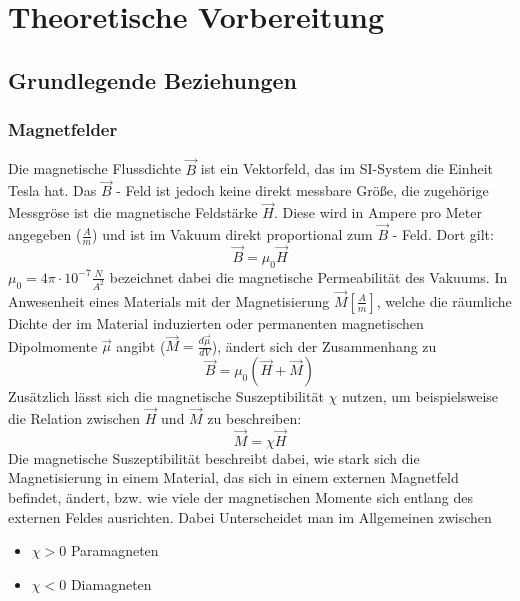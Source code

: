 \section{Theoretische Vorbereitung}
    \subsection{Grundlegende Beziehungen}
        \subsubsection{Magnetfelder}
            Die magnetische Flussdichte $\vec{B}$ ist ein Vektorfeld, das im SI-System die Einheit Tesla hat.
            Das $\vec{B}$ - Feld ist jedoch keine direkt messbare Größe, die zugehörige Messgröse ist die magnetische Feldstärke $\vec{H}$.
            Diese wird in Ampere pro Meter angegeben ($\frac{A}{m}$) und ist im Vakuum direkt proportional
            zum $\vec{B}$ - Feld. Dort gilt:
            \begin{equation}
                \vec{B} = \mu_0 \vec{H}
            \end{equation}
            $\mu_0 = 4\pi \cdot 10^{-7}\frac{N}{A^2}$ bezeichnet dabei die magnetische Permeabilität des Vakuums.
            In Anwesenheit eines Materials mit der Magnetisierung $\vec{M} [\frac{A}{m}]$, welche die räumliche Dichte der im Material induzierten oder permanenten magnetischen Dipolmomente $\vec{\mu}$ angibt ($\vec{M} = \frac{d\vec{\mu}}{dV}$), ändert sich der Zusammenhang zu
            \begin{equation}
                \vec{B} = \mu_0 (\vec{H} + \vec{M})
            \end{equation}
            Zusätzlich lässt sich die magnetische Suszeptibilität $\chi$ nutzen, um beispielsweise die Relation zwischen $\vec{H}$ und $\vec{M}$ zu beschreiben:
            \begin{equation}
                \vec{M} = \chi \vec{H}
            \end{equation}
            Die magnetische Suszeptibilität beschreibt dabei, wie stark sich die Magnetisierung in einem
            Material, das sich in einem externen Magnetfeld befindet, ändert, bzw. wie viele der magnetischen Momente sich entlang des externen Feldes ausrichten.
            Dabei Unterscheidet man im Allgemeinen zwischen
            \begin{itemize}
                \item $\chi > 0$ Paramagneten
                \item $\chi < 0$ Diamagneten
            \end{itemize}
